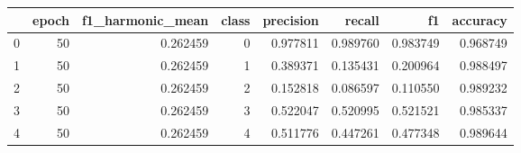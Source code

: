 \begin{tabular}{lrrrrrrr}
\toprule
 & epoch & f1_harmonic_mean & class & precision & recall & f1 & accuracy \\
\midrule
0 & 50 & 0.262459 & 0 & 0.977811 & 0.989760 & 0.983749 & 0.968749 \\
1 & 50 & 0.262459 & 1 & 0.389371 & 0.135431 & 0.200964 & 0.988497 \\
2 & 50 & 0.262459 & 2 & 0.152818 & 0.086597 & 0.110550 & 0.989232 \\
3 & 50 & 0.262459 & 3 & 0.522047 & 0.520995 & 0.521521 & 0.985337 \\
4 & 50 & 0.262459 & 4 & 0.511776 & 0.447261 & 0.477348 & 0.989644 \\
\bottomrule
\end{tabular}
